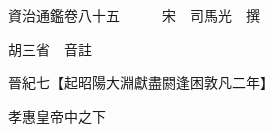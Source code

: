 










 


 
 


 

  
  
  
  
  





  
  
  
  
  
 
  

  

  
  
  



  

 
 

  
   




  

  
  


  　　資治通鑑卷八十五　　　宋　司馬光　撰

　　胡三省　音註

　　晉紀七【起昭陽大淵獻盡閼逢困敦凡二年】

　　孝惠皇帝中之下

